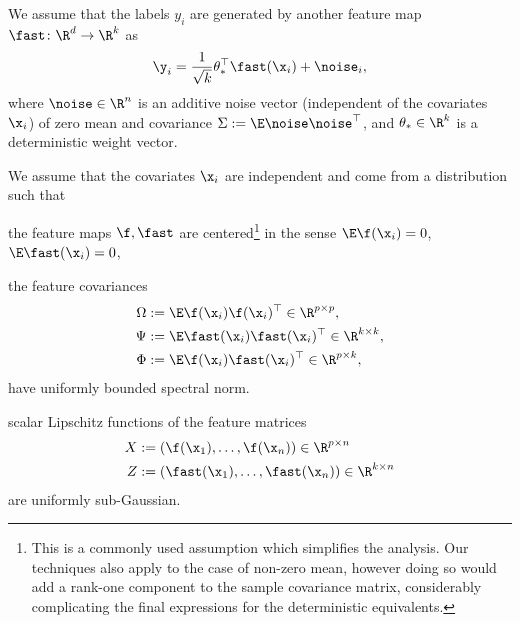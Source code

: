 \begin{assumption}[Labels]\label{ass:labels}
    We assume that the labels $y_i$ are generated by another feature map $\fast\colon\R^d\to\R^k$ as
    \begin{equation}
        \y_i = \frac{1}{\sqrt{k}}\theta_\ast^\top \fast(\x_i) + \noise_i,
    \end{equation}
    where $\noise\in\R^n$ is an additive noise vector (independent of the covariates $\x_i$) of zero mean and covariance $\Sigma:=\E \noise\noise^\top$, and $\theta_\ast\in\R^{k}$ is a deterministic weight vector.
\end{assumption}
\begin{assumption}\label{ass:data+features}
    We assume that the covariates $\x_i$ are independent and come from a distribution such that
    \begin{condenum}
        \item\label{cond centered} the feature maps $\f,\fast$ are centered\footnote{This is a commonly used assumption which simplifies the analysis. Our techniques also apply to the case of non-zero mean, however doing so would add a rank-one component to the sample covariance matrix, considerably complicating the final expressions for the deterministic equivalents.} in the sense $\E\f(\x_i)=0$, $\E\fast(\x_i)=0$,
        \item\label{cond cov} the feature covariances
        \begin{equation}
            \begin{split}
                \Omega&:=\E \f(\x_i)\f(\x_i)^\top\in\R^{p\times p},\\
                \Psi&:=\E \fast(\x_i)\fast(\x_i)^\top\in\R^{k\times k},\\
                \Phi&:=\E \f(\x_i)\fast(\x_i)^\top\in\R^{p\times k},
            \end{split}
        \end{equation}
        have uniformly bounded spectral norm.
        \item\label{cond Lipschitz conc} scalar Lipschitz functions of the feature matrices
        \begin{equation}
            \begin{split}
                X&:=(\f(\x_1),\ldots,\f(\x_n))\in\R^{p\times n}\\
                Z&:=(\fast(\x_1),\ldots,\fast(\x_n))\in\R^{k\times n}
            \end{split}
        \end{equation} are uniformly sub-Gaussian.
    \end{condenum}
\end{assumption}
